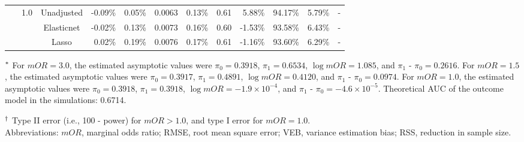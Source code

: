 \documentclass{article}
\begin{document}
\begin{center}
\begin{table}[!ht]
\begin{tabular*}{\textwidth}{@{\extracolsep\fill}c|c|c|rrrr|rrrrr}
        ~ & \multirow{3}{*}{1.0} & Unadjusted & -0.09\% & 0.05\% & 0.0063 & 0.13\% & 0.61 & 5.88\% & 94.17\% & 5.79\% & \multicolumn{1}{c}{-} \\ 
        ~ & ~ & Elasticnet & -0.02\% & 0.13\% & 0.0073 & 0.16\% & 0.60 & -1.53\% & 93.58\% & 6.43\% & \multicolumn{1}{c}{-} \\ 
        ~ & ~ & Lasso & 0.02\% & 0.19\% & 0.0076 & 0.17\% & 0.61 & -1.16\% & 93.60\% & 6.29\% & \multicolumn{1}{c}{-} \\  
\bottomrule
\end{tabular*}
\begin{tablenotes}
\item[$^{\rm *}$] For $mOR=3.0$, the estimated asymptotic values were $\pi_0 = 0.3918$,  $\pi_1 = 0.6534 $,  $\log mOR = 1.085$,  and $\pi_1$ - $\pi_0 = 0.2616$.
For $mOR=1.5$,  the estimated asymptotic values were $\pi_0 = 0.3917$,  $\pi_1 = 0.4891$,  $\log mOR = 0.4120$,  and $\pi_1$ - $\pi_0 = 0.0974$.
For $mOR=1.0$, the estimated asymptotic values were $\pi_0 = 0.3918$,  $\pi_1 = 0.3918$,  $\log mOR = -1.9\times 10^{-4}$,  and  $\pi_1$ - $\pi_0 = -4.6\times 10^{-5}$. Theoretical AUC of the outcome model in the simulations: 0.6714.
\item[$^{\rm \dagger}$]Type II error (i.e., 100 - power) for $mOR>1.0$, and type I error for $mOR=1.0$.\\
Abbreviations:  $mOR$, marginal odds ratio; RMSE, root mean square error; VEB, variance estimation bias; RSS,  reduction in sample size.
\end{tablenotes}
\end{table}
\end{center} 


\clearpage
\end{document}
